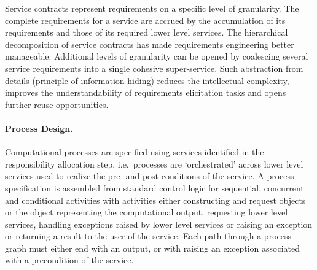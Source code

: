 Service contracts represent requirements on a specific level of granularity. The complete requirements for a service are accrued by the accumulation of its requirements and those of its required lower level services. The hierarchical decomposition of service contracts has made requirements engineering better manageable. Additional levels of granularity can be opened by coalescing several service requirements into a single cohesive super-service. Such abstraction from details (principle of information hiding) reduces the intellectual complexity, improves the understandability of requirements elicitation tasks and op\-ens further reuse opportunities. 

\paragraph{Process Design.} Computational processes are specified using services id\-entified in the responsibility allocation step, i.e.\ processes are `orchestrated' across lower level services used to realize the pre- and post-conditions of the service. A process specification is assembled from standard control logic for sequential, concurrent and conditional activities with activities either  constructing and request objects or the object representing the computational output, requesting lower level services, handling exceptions raised by lower level services or raising an exception or returning a result to the user of the service. Each path through a process graph must either end with an output, or with raising an exception associated with a precondition of the service.


